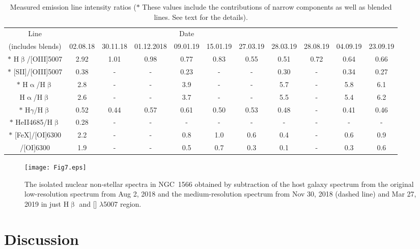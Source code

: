 \documentclass[fleqn,usenatbib]{mnras}
\begin{document}
\begin{table*}
\centering
\caption{Measured emission line intensity ratios ($*$ These values include the contributions of narrow components as well as blended lines. See text for the details).}
\tabcolsep=0.11cm
\begin{tabular}{ccccccccccc} \hline
Line &&&& Date &&&&\\
(includes blends) &02.08.18&30.11.18&01.12.2018&09.01.19&15.01.19&27.03.19&28.03.19&28.08.19&04.09.19&23.09.19 \\ \hline \smallskip
 $*$ H$\upbeta$/[OIII]5007    &  2.92 & 1.01  & 0.98 & 0.77 & 0.83 & 0.55 & 0.51& 0.72 &0.64 &0.66 \\ \smallskip
 $*$ [SII]/[OIII]5007  &  0.38 & -         & -       & 0.23 & -       & -        & 0.30&-&0.34&0.27\\ \smallskip
 $*$ H$\upalpha$/H$\upbeta$   &  2.8 & -         & -       & 3.9 & -       & -        & 5.7&-&5.8&6.1\\ \smallskip
 H$\upalpha$/H$\upbeta$   &  2.6 & -         & -       & 3.7 & -       & -        & 5.5&-&5.4&6.2\\ \smallskip
  $*$ H$\gamma$/H$\upbeta$ &  0.52 & 0.44 & 0.57 & 0.61 & 0.50 & 0.53 & 0.48&-&0.41&0.46 \\ \smallskip
 $*$ HeII4685/H$\upbeta$      & 0.28 & -   & - & -       & - & - & -  &-&-&-    \\ \smallskip
 $*$ [FeX]/[OI]6300     &  2.2  & -          & -       & 0.8  & 1.0     & 0.6  & 0.4&-&0.6&0.9 \\ \smallskip
 [FeX]/[OI]6300     &  1.9  & -          & -       & 0.5  & 0.7     & 0.3  & 0.1&-&0.3&0.6 \\ 
\hline

\end{tabular}

\label{tab2}
\end{table*}

\begin{figure}
	\texttt{[image: Fig7.eps]}

    \caption{The isolated nuclear non-stellar spectra in NGC~1566 obtained by subtraction of the host galaxy spectrum from the original low-resolution spectrum from Aug 2, 2018  and the medium-resolution spectrum from Nov 30,  2018 (dashed line) and  Mar 27, 2019 in just H$\upbeta$ and [] $\lambda$5007 region.}
    \label{fig9}
\end{figure}


\section{Discussion}
\end{document}

